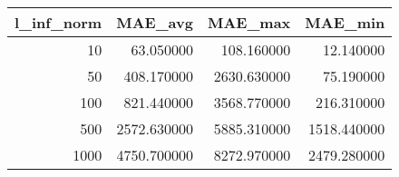 \begin{tabular}{rrrr}
\toprule
l_inf_norm & MAE_avg & MAE_max & MAE_min \\
\midrule
10 & 63.050000 & 108.160000 & 12.140000 \\
50 & 408.170000 & 2630.630000 & 75.190000 \\
100 & 821.440000 & 3568.770000 & 216.310000 \\
500 & 2572.630000 & 5885.310000 & 1518.440000 \\
1000 & 4750.700000 & 8272.970000 & 2479.280000 \\
\bottomrule
\end{tabular}
